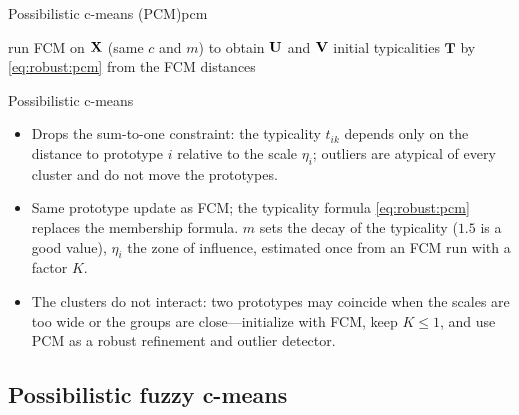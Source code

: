 \begin{algobox}{Possibilistic c-means (PCM)}{pcm}
\begin{algorithm}[H]
run FCM on $\mathbf{X}$ (same $c$ and $m$) to obtain $\mathbf{U}$ and $\mathbf{V}$\;
initial typicalities $\mathbf{T}$ by \eqref{eq:robust:pcm} from the FCM distances\;
\end{algorithm}
\end{algobox}
\begin{summarybox}{Possibilistic c-means}
\begin{itemize}
  \item Drops the sum-to-one constraint: the typicality $t_{ik}$ depends only on the distance to prototype $i$ relative to the scale $\eta_i$; outliers are atypical of every cluster and do not move the prototypes.
  \item Same prototype update as FCM; the typicality formula \eqref{eq:robust:pcm} replaces the membership formula. $m$ sets the decay of the typicality ($1.5$ is a good value), $\eta_i$ the zone of influence, estimated once from an FCM run with a factor $K$.
  \item The clusters do not interact: two prototypes may coincide when the scales are too wide or the groups are close---initialize with FCM, keep $K\le1$, and use PCM as a robust refinement and outlier detector.
\end{itemize}
\end{summarybox}

\subsection{Possibilistic fuzzy c-means}\label{sec:robust:pfcm}

